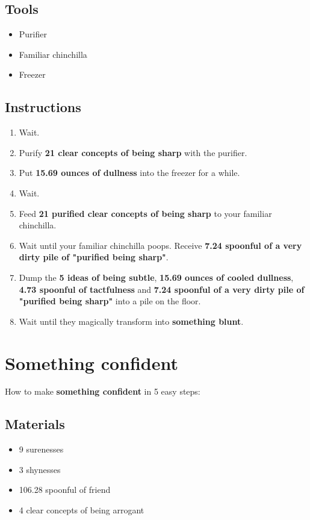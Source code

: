 \documentclass{article}
\begin{document}
\subsection{Tools}\begin{itemize}
\item 
Purifier
\item 
Familiar chinchilla
\item 
Freezer
\end{itemize}
\subsection{Instructions}\begin{enumerate}
\item 
Wait.
\item 
Purify \textbf{21 clear concepts of being sharp} with the purifier.
\item 
Put \textbf{15.69 ounces of dullness} into the freezer for a while.
\item 
Wait.
\item 
Feed \textbf{21 purified clear concepts of being sharp} to your familiar chinchilla.
\item 
Wait until your familiar chinchilla poops. Receive \textbf{7.24 spoonful of a very dirty pile of "purified being sharp"}.
\item 
Dump the \textbf{5 ideas of being subtle}, \textbf{15.69 ounces of cooled dullness}, \textbf{4.73 spoonful of tactfulness} and \textbf{7.24 spoonful of a very dirty pile of "purified being sharp"} into a pile on the floor.
\item 
Wait until they magically transform into \textbf{something blunt}.
\end{enumerate}
\newpage
\section{Something confident}How to make \textbf{something confident} in 5 easy steps:

\subsection{Materials}\begin{itemize}
\item 
9 surenesses
\item 
3 shynesses
\item 
106.28 spoonful of friend
\item 
4 clear concepts of being arrogant
\end{itemize}
\end{document}
